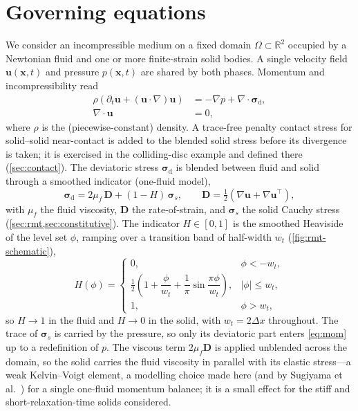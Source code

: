 \documentclass[final,3p,times]{elsarticle}
\theoremstyle{remark}
\newcommand{\uv}{\bm{u}}                 %
\newcommand{\xv}{\bm{x}}                 %
\newcommand{\sig}{\bm{\sigma}}          %
\newcommand{\grad}{\nabla}
\newcommand{\dive}{\grad\!\cdot\!}
\newcommand{\dx}{\Delta x}
\begin{document}
\section{Governing equations}
\label{sec:governing}

We consider an incompressible medium on a fixed domain $\Omega\subset\mathbb{R}^2$
occupied by a Newtonian fluid and one or more finite-strain solid bodies. A single
velocity field $\uv(\xv,t)$ and pressure $p(\xv,t)$ are shared by both phases. Momentum
and incompressibility read
\begin{align}
\rho\left(\partial_t\uv + (\uv\!\cdot\!\grad)\uv\right)
   &= -\grad p + \dive\sig_{\mathrm{d}},
   \label{eq:mom}\\
\dive\uv &= 0,
   \label{eq:incomp}
\end{align}
where $\rho$ is the (piecewise-constant) density. A trace-free penalty contact stress for
solid--solid near-contact is added to the blended solid stress before its divergence is taken;
it is exercised in the colliding-disc example and defined there (\cref{sec:contact}).
The deviatoric stress $\sig_{\mathrm d}$ is
blended between fluid and solid through a smoothed indicator (one-fluid model),
\begin{equation}
\sig_{\mathrm d} = 2\mu_f\,\bm D
   + (1-H)\,\sig_{\!s},
   \qquad
\bm D=\tfrac12\!\left(\grad\uv+\grad\uv^{\!\top}\right),
   \label{eq:blend}
\end{equation}
with $\mu_f$ the fluid viscosity, $\bm D$ the rate-of-strain, and $\sig_{\!s}$ the solid
Cauchy stress (\cref{sec:rmt,sec:constitutive}). The indicator $H\in[0,1]$ is the smoothed
Heaviside of the level set $\phi$, ramping over a transition band of half-width $w_t$
(\cref{fig:rmt-schematic}),
\begin{equation}
H(\phi)=
\begin{cases}
0, & \phi<-w_t,\\[2pt]
\tfrac12\!\left(1+\dfrac{\phi}{w_t}+\dfrac1\pi\sin\dfrac{\pi\phi}{w_t}\right), & |\phi|\le w_t,\\[6pt]
1, & \phi>w_t,
\end{cases}
\label{eq:heaviside}
\end{equation}
so $H\to1$ in the fluid and $H\to0$ in the solid, with $w_t=2\dx$ throughout. The trace of
$\sig_{\!s}$ is carried by the pressure, so only its deviatoric part enters
\cref{eq:mom} up to a redefinition of $p$. The viscous term $2\mu_f\bm D$ is applied
unblended across the domain, so the solid carries the fluid viscosity in parallel with
its elastic stress---a weak Kelvin--Voigt element, a modelling choice made here (and by
Sugiyama et al.\ \cite{Sugiyama2011}) for a single one-fluid momentum balance; it is a
small effect for the stiff and short-relaxation-time solids considered.
\end{document}
